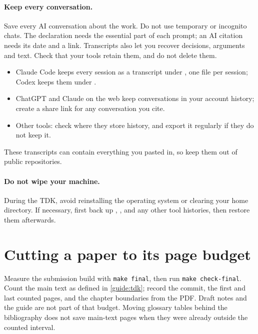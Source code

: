 \paragraph{Keep every conversation.} Save every AI conversation about the work. Do not use temporary or incognito chats. The declaration needs the essential part of each prompt; an AI citation needs its date and a link. Transcripts also let you recover decisions, arguments and text. Check that your tools retain them, and do not delete them.
\begin{itemize}[noitemsep]
  \item Claude Code keeps every session as a transcript under , one file per session; Codex keeps them under .
  \item ChatGPT and Claude on the web keep conversations in your account history; create a share link for any conversation you cite.
  \item Other tools: check where they store history, and export it regularly if they do not keep it.
\end{itemize}
These transcripts can contain everything you pasted in, so keep them out of public repositories.

\paragraph{Do not wipe your machine.} During the TDK, avoid reinstalling the operating system or clearing your home directory. If necessary, first back up , ,  and any other tool histories, then restore them afterwards.


\section{Cutting a paper to its page budget}\label{guide:writing:cutting}

Measure the submission build with \texttt{make final}, then run
\texttt{make check-final}. Count the main text as defined in
\cref{guide:tdk}; record the commit, the first and last counted pages, and the
chapter boundaries from the PDF. Draft notes and the guide are not part of
that budget. Moving glossary tables behind the bibliography does not save
main-text pages when they were already outside the counted interval.

